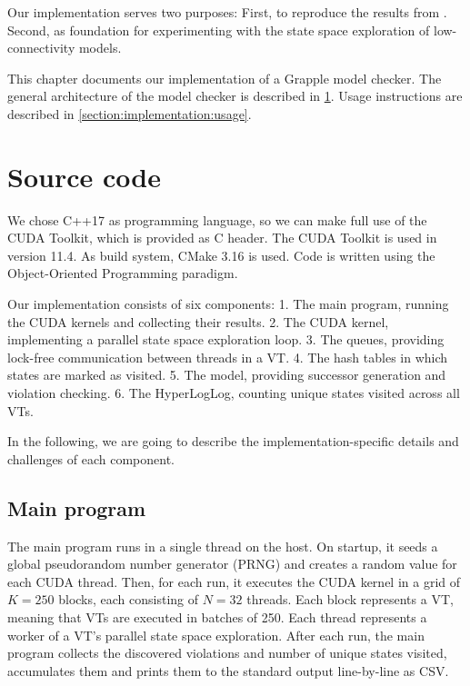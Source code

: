 \documentclass[
fancyheadings, %
%
%
]{stsreprt}
\begin{document}
Our implementation serves two purposes:
First, to reproduce the results from \cite{DeFrancisco2020.Grapple}.
Second, as foundation for experimenting with the state space exploration of low-connectivity models.

This chapter documents our implementation of a Grapple model checker.
The general architecture of the model checker is described in \cref{section:implementation:source-code}.
Usage instructions are described in \cref{section:implementation:usage}.

\section{Source code}
\label{section:implementation:source-code}

We chose C++17 as programming language, so we can make full use of the CUDA Toolkit, which is provided as C header.
The CUDA Toolkit is used in version 11.4.
As build system, CMake 3.16 is used.
Code is written using the Object-Oriented Programming paradigm.

Our implementation consists of six components:
1. The main program, running the CUDA kernels and collecting their results.
2. The CUDA kernel, implementing a parallel state space exploration loop.
3. The queues, providing lock-free communication between threads in a VT.
4. The hash tables in which states are marked as visited.
5. The model, providing successor generation and violation checking.
6. The HyperLogLog, counting unique states visited across all VTs.

In the following, we are going to describe the implementation-specific details and challenges of each component.

\subsection{Main program}

The main program runs in a single thread on the host.
On startup, it seeds a global pseudorandom number generator (PRNG) and creates a random value for each CUDA thread.
Then, for each run, it executes the CUDA kernel in a grid of $K=250$ blocks, each consisting of $N=32$ threads.
Each block represents a VT, meaning that VTs are executed in batches of 250.
Each thread represents a worker of a VT's parallel state space exploration.
After each run, the main program collects the discovered violations and number of unique states visited, accumulates them and prints them to the standard output line-by-line as CSV.
\end{document}
